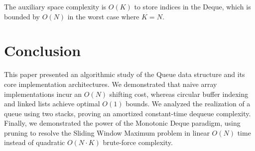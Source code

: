 \documentclass[10pt,journal,compsoc,onecolumn]{IEEEtran}
\begin{document}
The auxiliary space complexity is $O(K)$ to store indices in the Deque, which is bounded by $O(N)$ in the worst case where $K = N$.

\section{Conclusion}
This paper presented an algorithmic study of the Queue data structure and its core implementation architectures. We demonstrated that naive array implementations incur an $O(N)$ shifting cost, whereas circular buffer indexing and linked lists achieve optimal $O(1)$ bounds. We analyzed the realization of a queue using two stacks, proving an amortized constant-time dequeue complexity. Finally, we demonstrated the power of the Monotonic Deque paradigm, using pruning to resolve the Sliding Window Maximum problem in linear $O(N)$ time instead of quadratic $O(N \cdot K)$ brute-force complexity.
\end{document}
